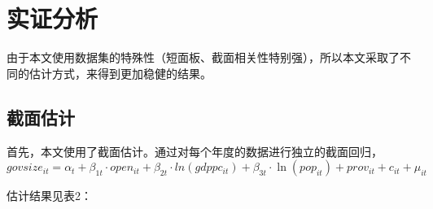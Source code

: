 \documentclass[10pt]{article}
\begin{document}
\section{实证分析}
    由于本文使用数据集的特殊性（短面板、截面相关性特别强），所以本文采取了不同的估计方式，来得到更加稳健的结果。
\subsection{截面估计}
    首先，本文使用了截面估计。通过对每个年度的数据进行独立的截面回归，
    \begin{equation}
        govsize_{it} = \alpha_t + \beta_{1t} \cdot open_{it} + \beta_{2t} \cdot ln(gdppc_{it}) + \beta_{3t} \cdot \ln(pop_{it}) + prov_{it} +c_{it} + \mu_{it}
    \end{equation}


    估计结果见表2：
\end{document}
